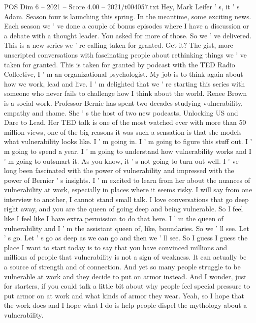 \begin{textsample}{POS Dim 6 – 2021 – Score 4.00 – 2021/t004057.txt}  \label{ex:f6_pos_078}
Hey, Mark Leifer ' s, it ' s Adam.
Season four is launching this spring.
In the meantime, some exciting news.
Each season we ' ve done a couple of bonus episodes where I have a discussion or a debate with a thought leader.
You asked for more of those.
So we ' ve delivered.
This is a new series we ' re calling taken for granted.
Get it?
The gist, more unscripted conversations with fascinating people about rethinking things we ' ve taken for granted.
This is taken for granted by podcast with the TED Radio Collective, I ' m an organizational psychologist.
My job is to think again about how we work, lead and live.
I ' m delighted that we ' re starting this series with someone who never fails to challenge how I think about the world.
Renee Brown is a social work.
Professor Bernie has spent two decades studying vulnerability, empathy and shame.
She ' s the host of two new podcasts, Unlocking US and Dare to Lead.
Her TED talk is one of the most watched ever with more than 50 million views, one of the big reasons it was such a sensation is that she models what vulnerability looks like.
I ' m going in.
I ' m going to figure this stuff out.
I ' m going to spend a year.
I ' m going to understand how vulnerability works and I ' m going to outsmart it.
As you know, it ' s not going to turn out well.
I ' ve long been fascinated with the power of vulnerability and impressed with the power of Bernier ' s insights.
I ' m excited to learn from her about the nuances of vulnerability at work, especially in places where it seems risky.
I will say from one interview to another, I cannot stand small talk.
I love conversations that go deep right away, and you are the queen of going deep and being vulnerable.
So I feel like I feel like I have extra permission to do that here.
I ' m the queen of vulnerability and I ' m the assistant queen of, like, boundaries.
So we ' ll see.
Let ' s go.
Let ' s go as deep as we can go and then we ' ll see.
So I guess I guess the place I want to start today is to say that you have convinced millions and millions of people that vulnerability is not a sign of weakness.
It can actually be a source of strength and of connection.
And yet so many people struggle to be vulnerable at work and they decide to put on armor instead.
And I wonder, just for starters, if you could talk a little bit about why people feel special pressure to put armor on at work and what kinds of armor they wear.
Yeah, so I hope that the work does and I hope what I do is help people dispel the mythology about a vulnerability.

\end{textsample}
